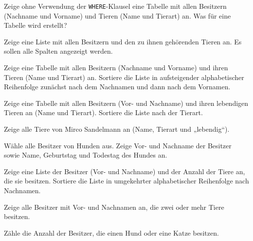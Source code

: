 \begin{compactenum}[a)]
\item Zeige ohne Verwendung der \lstinline{WHERE}-Klausel eine Tabelle mit
allen Besitzern (Nachname und Vorname) und Tieren (Name und Tierart) an. Was
für eine Tabelle wird erstellt?
\item Zeige eine Liste mit allen Besitzern und den zu ihnen gehörenden Tieren
an. Es sollen alle Spalten angezeigt werden.
\item Zeige eine Tabelle mit allen Besitzern (Nachname und Vorname) und ihren
Tieren (Name und Tierart) an. Sortiere die Liste in aufsteigender
alphabetischer Reihenfolge zunächst nach dem Nachnamen und dann nach dem
Vornamen.
\item Zeige eine Tabelle mit allen Besitzern (Vor- und Nachname) und ihren
lebendigen Tieren an (Name und Tierart). Sortiere die Liste nach der
Tierart.
\item Zeige alle Tiere von Mirco Sandelmann an (Name, Tierart und „lebendig“).
\item Wähle alle Besitzer von Hunden aus. Zeige Vor- und Nachname der
Besitzer sowie Name, Geburtstag und Todestag des Hundes an.
\item Zeige eine Liste der Besitzer (Vor- und Nachname) und der Anzahl der
Tiere an, die sie besitzen. Sortiere die Liste in umgekehrter alphabetischer
Reihenfolge nach Nachnamen.
\item Zeige alle Besitzer mit Vor- und Nachnamen an, die zwei oder mehr Tiere
besitzen.
\item Zähle die Anzahl der Besitzer, die einen Hund oder eine Katze besitzen.
\end{compactenum}